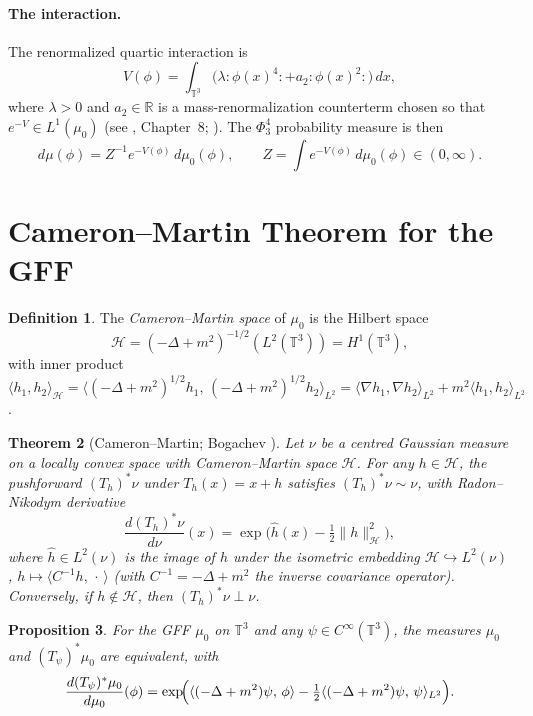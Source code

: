 \documentclass[12pt]{article}
\newtheorem{theorem}{Theorem}
\newtheorem{proposition}[theorem]{Proposition}
\theoremstyle{definition}
\newtheorem{definition}[theorem]{Definition}
\begin{document}
\paragraph{The interaction.}
The renormalized quartic interaction is
\[
  V(\phi) = \int_{\mathbb{T}^3} \bigl(\lambda :\!\phi(x)^4\!: + a_2 :\!\phi(x)^2\!: \bigr)\, dx,
\]
where $\lambda > 0$ and $a_2 \in \mathbb{R}$ is a mass-renormalization counterterm chosen so that
$e^{-V} \in L^1(\mu_0)$ (see \cite{glimmjaffe}, Chapter~8; \cite{hairer2014theory}). The
$\Phi^4_3$ probability measure is then
\begin{equation}
\label{eq:phi4}
  d\mu(\phi) = Z^{-1} e^{-V(\phi)}\, d\mu_0(\phi),\qquad
  Z = \int e^{-V(\phi)}\, d\mu_0(\phi) \in (0,\infty).
\end{equation}

\section{Cameron--Martin Theorem for the GFF}

\begin{definition}
The \emph{Cameron--Martin space} of $\mu_0$ is the Hilbert space
\[
  \mathcal{H} = (-\Delta + m^2)^{-1/2}(L^2(\mathbb{T}^3))
             = H^1(\mathbb{T}^3),
\]
with inner product $\langle h_1, h_2\rangle_{\mathcal{H}}
  = \langle (-\Delta+m^2)^{1/2} h_1,\,(-\Delta+m^2)^{1/2} h_2\rangle_{L^2}
  = \langle \nabla h_1, \nabla h_2\rangle_{L^2} + m^2\langle h_1, h_2\rangle_{L^2}$.
\end{definition}

\begin{theorem}[Cameron--Martin; Bogachev {\cite[Theorem~2.1.6]{bogachev}}]
\label{thm:cm}
Let $\nu$ be a centred Gaussian measure on a locally convex space with Cameron--Martin space
$\mathcal{H}$. For any $h \in \mathcal{H}$, the pushforward $(T_h)^*\nu$ under $T_h(x) = x + h$
satisfies $(T_h)^*\nu \sim \nu$, with Radon--Nikodym derivative
\[
  \frac{d(T_h)^*\nu}{d\nu}(x)
  = \exp\!\bigl(\widehat{h}(x) - \tfrac{1}{2}\|h\|_{\mathcal{H}}^2\bigr),
\]
where $\widehat{h} \in L^2(\nu)$ is the image of $h$ under the isometric embedding
$\mathcal{H} \hookrightarrow L^2(\nu)$, $h \mapsto \langle C^{-1}h,\,\cdot\,\rangle$ (with
$C^{-1} = -\Delta+m^2$ the inverse covariance operator).
Conversely, if $h \notin \mathcal{H}$, then $(T_h)^*\nu \perp \nu$.
\end{theorem}

\begin{proposition}
\label{prop:cm-gff}
For the GFF $\mu_0$ on $\mathbb{T}^3$ and any $\psi \in C^\infty(\mathbb{T}^3)$, the measures
$\mu_0$ and $(T_\psi)^*\mu_0$ are equivalent, with
\begin{equation}
\label{eq:rn-gff}
  \frac{d(T_\psi)^*\mu_0}{d\mu_0}(\phi)
  = \exp\!\Bigl(\langle (-\Delta+m^2)\psi,\, \phi\rangle
    - \tfrac{1}{2}\langle (-\Delta+m^2)\psi,\, \psi\rangle_{L^2}\Bigr).
\end{equation}
\end{proposition}
\end{document}
